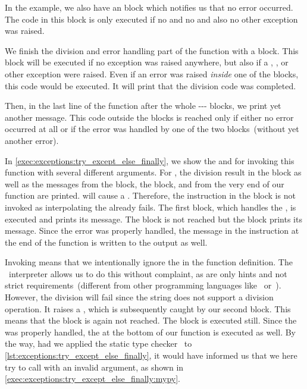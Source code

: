 In the example, we also have an  block which notifies us that no error occurred.
The code in this block is only executed if no  and no  and also no other exception was raised.

We finish the division and error handling part of the function with a  block.
This block will be executed if no exception was raised anywhere, but also if a , , or other exception were raised.
Even if an error was raised \emph{inside} one of the  blocks, this code would be executed.
It will print that the division code was completed.

Then, in the last line of the function after the whole --- blocks, we print yet another message.
This code outside the blocks is reached only if either no error occurred at all or if the error was handled by one of the two  blocks~(without yet another error).

In \cref{exec:exceptions:try_except_else_finally}, we show the  and  for invoking this function with several different arguments.
For , the division result in the  block as well as the messages from the  block, the  block, and from the very end of our function are printed.
 will cause a .
Therefore, the  instruction in the  block is not invoked as interpolating the  already fails.
The first  block, which handles the , is executed and prints its message.
The  block is not reached but the  block prints its message.
Since the error was properly handled, the message in the  instruction at the end of the function is written to the output as well.

Invoking  means that we intentionally ignore the  in the function definition.
The \python\ interpreter allows us to do this without complaint, as  are only hints and not strict requirements~(different from other programming languages like~ or~).
However, the division  will fail since the string  does not support a division operation.
It raises a , which is subsequently caught by our second  block.
This means that the  block is again not reached.
The  block is executed still.
Since the  was properly handled, the  at the bottom of our function is executed as well.
By the way, had we applied the static type checker \mypy\ to \cref{lst:exceptions:try_except_else_finally}, it would have informed us that we here try to call  with an invalid argument, as shown in \cref{exec:exceptions:try_except_else_finally:mypy}.

